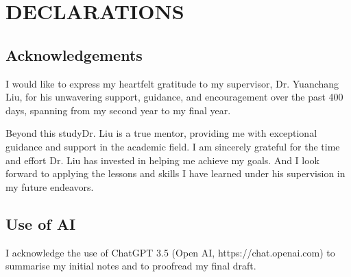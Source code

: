 \section{DECLARATIONS}
\label{sec:declarations}
\subsection{Acknowledgements}
I would like to express my heartfelt gratitude to my supervisor, Dr. Yuanchang Liu, 
for his unwavering support, guidance, and encouragement over the past 400 days, 
spanning from my second year to my final year. 

Beyond this studyDr. Liu is a true mentor, 
providing me with exceptional guidance and support in the academic field. 
I am sincerely grateful for the time and effort Dr. Liu has invested in helping me achieve my goals. 
And I look forward to applying the lessons and skills I have learned under his supervision in my future endeavors.
\subsection{Use of AI}
I acknowledge the use of ChatGPT 3.5 (Open AI, https://chat.openai.com) to summarise my initial notes and to proofread my final draft.
